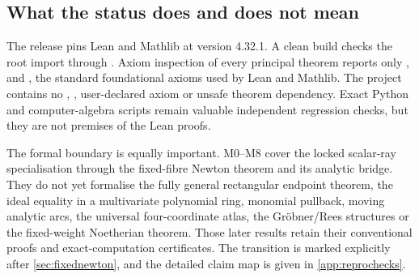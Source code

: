 \subsection{What the status does and does not mean}

The release pins Lean and Mathlib at version 4.32.1.  A clean build checks the
root import through .  Axiom inspection of every
principal theorem reports only ,  and
, the standard foundational axioms used by Lean and Mathlib.
The project contains no , , user-declared axiom or
unsafe theorem dependency.  Exact Python and computer-algebra scripts remain
valuable independent regression checks, but they are not premises of the Lean
proofs.

The formal boundary is equally important.  M0--M8 cover the locked scalar-ray
specialisation through the fixed-fibre Newton theorem and its analytic bridge.
They do not yet formalise the fully general rectangular endpoint theorem, the
ideal equality in a multivariate polynomial ring, monomial pullback, moving
analytic arcs, the universal four-coordinate atlas, the Gr\"obner/Rees
structures or the fixed-weight Noetherian theorem.  Those later results retain
their conventional proofs and exact-computation certificates.  The transition
is marked explicitly after \cref{sec:fixednewton}, and the detailed claim map is
given in \cref{app:reprochecks}.
